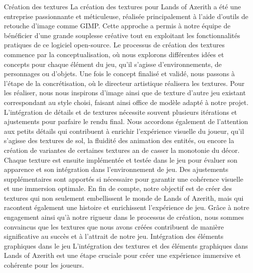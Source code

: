 Création des textures La création des textures pour Lands of Azerith a été une entreprise passionnante et méticuleuse, réalisée principalement à l'aide d'outils de retouche d'image comme GIMP.
Cette approche a permis à notre équipe de bénéficier d'une grande souplesse créative tout en exploitant les fonctionnalités pratiques de ce logiciel open-source.
Le processus de création des textures commence par la conceptualisation, où nous explorons différentes idées et concepts pour chaque élément du jeu, qu'il s'agisse d'environnements, de personnages ou d'objets.
Une fois le concept finalisé et validé, nous passons à l'étape de la concrétisation, où le directeur artistique réalisera les textures.
Pour les réaliser, nous nous inspirons d'image ainsi que de texture d'autre jeu existant correspondant au style choisi, faisant ainsi office de modèle adapté à notre projet.
L'intégration de détails et de textures nécessite souvent plusieurs itérations et ajustements pour parfaire le rendu final.
Nous accordons également de l'attention aux petits détails qui contribuent à enrichir l'expérience visuelle du joueur, qu'il s'agisse des textures de sol, la fluidité des animation des entités, ou encore la création de variantes de certaines textures an de casser la monotonie du décor.
\\

Chaque texture est ensuite implémentée et testée dans le jeu pour évaluer son apparence et son intégration dans l'environnement de jeu.
Des ajustements supplémentaires sont apportés si nécessaire pour garantir une cohérence visuelle et une immersion optimale.
En fin de compte, notre objectif est de créer des textures qui non seulement embellissent le monde de Lands of Azerith, mais qui racontent également une histoire et enrichissent l'expérience de jeu.
Grâce à notre engagement ainsi qu'à notre rigueur dans le processus de création, nous sommes convaincus que les textures que nous avons créées contribuent de manière significative au succès et à l'attrait de notre jeu.
Intégration des éléments graphiques dans le jeu L'intégration des textures et des éléments graphiques dans Lands of Azerith est une étape cruciale pour créer une expérience immersive et cohérente pour les joueurs.
\\


